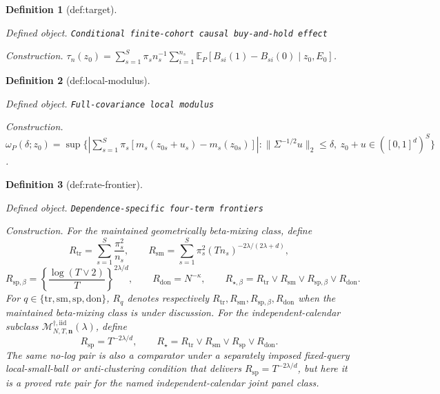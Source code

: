 \documentclass{article}
\newtheorem{definition}{Definition}
\begin{document}
\begin{definition}[def:target]\label{def:target}
\par\smallskip\noindent\emph{Defined object.} \texttt{Conditional finite-\allowbreak{}cohort causal buy-\allowbreak{}and-\allowbreak{}hold effect}
\par\smallskip\noindent\emph{Construction.} \(\tau_n(z_0)=\sum_{s=1}^{S}\pi_s n_s^{-1}\sum_{i=1}^{n_s}\mathbb E_P[B_{si}(1)-B_{si}(0)\mid z_0,E_0]\).
\end{definition}

\begin{definition}[def:local-modulus]\label{def:local-modulus}
\par\smallskip\noindent\emph{Defined object.} \texttt{Full-\allowbreak{}covariance local modulus}
\par\smallskip\noindent\emph{Construction.} \(\omega_P(\delta;z_0)=\sup\{|\sum_{s=1}^{S}\pi_s[m_s(z_{0s}+u_s)-m_s(z_{0s})]|:\|\Sigma^{-1/2}u\|_2\le\delta,\ z_0+u\in([0,1]^d)^S\}\).
\end{definition}

\begin{definition}[def:rate-frontier]\label{def:rate-frontier}
\par\smallskip\noindent\emph{Defined object.} \texttt{Dependence-\allowbreak{}specific four-\allowbreak{}term frontiers}
\par\smallskip\noindent\emph{Construction.} For the maintained geometrically beta-mixing class, define
\[
R_{\mathrm{tr}}=\sum_{s=1}^{S}\frac{\pi_s^2}{n_s},
\qquad
R_{\mathrm{sm}}=\sum_{s=1}^{S}\pi_s^2(Tn_s)^{-2\lambda/(2\lambda+d)},
\]
\[
R_{\mathrm{sp},\beta}=\left\{\frac{\log(T\vee2)}T\right\}^{2\lambda/d},
\qquad
R_{\mathrm{don}}=N^{-\kappa},
\qquad
R_{\star,\beta}=R_{\mathrm{tr}}\vee R_{\mathrm{sm}}\vee R_{\mathrm{sp},\beta}\vee R_{\mathrm{don}}.
\]
For \(q\in\{\mathrm{tr},\mathrm{sm},\mathrm{sp},\mathrm{don}\}\), \(R_q\) denotes respectively \(R_{\mathrm{tr}},R_{\mathrm{sm}},R_{\mathrm{sp},\beta},R_{\mathrm{don}}\) when the maintained beta-mixing class is under discussion.  For the independent-calendar subclass \(\mathcal M_{N,T,\mathbf n}^{\dagger,\mathrm{iid}}(\lambda)\), define
\[
R_{\mathrm{sp}}=T^{-2\lambda/d},
\qquad
R_\star=R_{\mathrm{tr}}\vee R_{\mathrm{sm}}\vee R_{\mathrm{sp}}\vee R_{\mathrm{don}}.
\]
The same no-log pair is also a comparator under a separately imposed fixed-query local-small-ball or anti-clustering condition that delivers \(R_{\mathrm{sp}}=T^{-2\lambda/d}\), but here it is a proved rate pair for the named independent-calendar joint panel class.
\end{definition}
\end{document}
